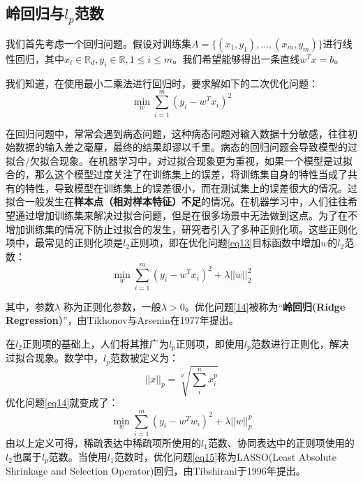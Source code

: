 \documentclass[12pt,a4paper]{article}
\begin{document}
\subsection{岭回归与$l_{p}$范数}
我们首先考虑一个回归问题。假设对训练集$A = \{(x_{1}, y_{1}), ... , (x_{m}, y_{m})\}$进行线性回归，其中$x_{i} \in \mathbb{R}_{d}, y_{i} \in \mathbb{R}, 1 \leq i \leq m$。我们希望能够得出一条直线$w^{T}x = b$。

我们知道，在使用最小二乘法进行回归时，要求解如下的二次优化问题：
\begin{equation}
\label{eq13}
\min_{w} \sum_{i = 1}^{m} (y_{i} - w^{T}x_{i})^2
\end{equation}

在回归问题中，常常会遇到病态问题，这种病态问题对输入数据十分敏感，往往初始数据的输入差之毫厘，最终的结果却谬以千里。病态的回归问题会导致模型的过拟合/欠拟合现象。在机器学习中，对过拟合现象更为重视，如果一个模型是过拟合的，那么这个模型过度关注了在训练集上的误差，将训练集自身的特性当成了共有的特性，导致模型在训练集上的误差很小，而在测试集上的误差很大的情况。过拟合一般发生在\textbf{样本点（相对样本特征）不足}的情况。在机器学习中，人们往往希望通过增加训练集来解决过拟合问题，但是在很多场景中无法做到这点。为了在不增加训练集的情况下防止过拟合的发生，研究者引入了多种正则化项。这些正则化项中，最常见的正则化项是$l_{2}$正则项，即在优化问题\eqref{eq13}目标函数中增加$w$的$l_{2}$范数：
\begin{equation}
\label{eq14}
\min_{w} \sum_{i = 1}^{m} (y_{i} - w^{T}x_{i})^2 + \lambda||w||_{2}^{2}
\end{equation}

其中，参数$\lambda$ 称为正则化参数，一般$\lambda > 0$。优化问题\eqref{14}被称为“\textbf{岭回归(Ridge Regression)}”，由Tikhonov与Arsenin在1977年提出。

在$l_{2}$正则项的基础上，人们将其推广为$l_{p}$正则项，即使用$l_{p}$范数进行正则化，解决过拟合现象。数学中，$l_{p}$范数被定义为：
\begin{equation*}
||x||_{p} = \sqrt[p]{\sum_{i}^{n} x_{i}^{p}}
\end{equation*}
优化问题\eqref{eq14}就变成了：
\begin{equation}
\label{eq15}
\min_{w} \sum_{i = 1}^{m} (y_{i} - w^{T}w_{i})^2 + \lambda||w||_{p}^{p}
\end{equation}
由以上定义可得，稀疏表达中稀疏项所使用的$l_{1}$范数、协同表达中的正则项使用的$l_{2}$也属于$l_{p}$范数。当使用$l_{1}$范数时，优化问题\eqref{eq15}称为LASSO(Least Absolute Shrinkage and Selection Operator)回归，由Tibshirani于1996年提出。
\end{document}
